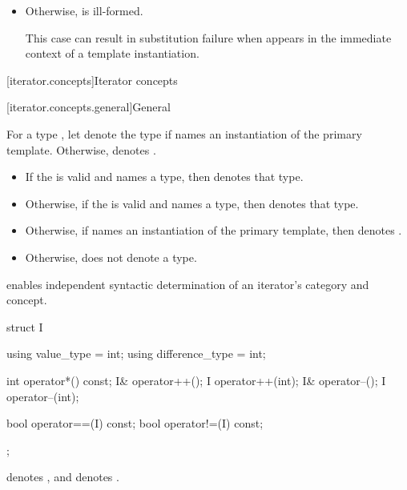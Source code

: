 \begin{addedblock}
\begin{itemize}
\item Otherwise,  is ill-formed.
  \begin{note}
  This case can result in substitution failure when 
  appears in the immediate context of a template instantiation.
  \end{note}
\end{itemize}

[iterator.concepts]{Iterator concepts}

[iterator.concepts.general]{General}

\pnum
For a type , let  denote the type
 if  names an instantiation of the primary
template. Otherwise,  denotes
.
\begin{itemize}
\item If the 
   is valid
  and names a type, then  denotes that
  type.
\item Otherwise, if the 
  is valid and names a type, then 
  denotes that type.
\item Otherwise, if  names an instantiation of
  the primary template, then  denotes
  .
\item Otherwise,  does not denote a type.
\end{itemize}

\pnum
\begin{note}
 enables independent syntactic determination
of an iterator's category and concept.
\end{note}
\begin{example}
\begin{codeblock}
struct I {
  using value_type = int;
  using difference_type = int;

  int operator*() const;
  I& operator++();
  I operator++(int);
  I& operator--();
  I operator--(int);

  bool operator==(I) const;
  bool operator!=(I) const;
};
\end{codeblock}
 denotes ,
and  denotes .
\end{example}


\end{addedblock}
